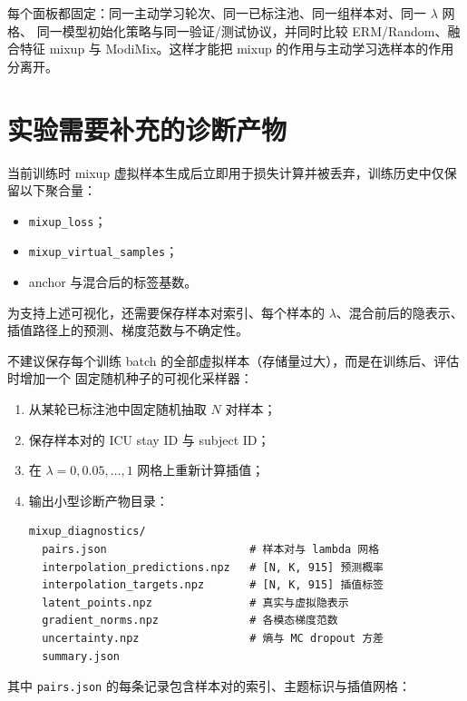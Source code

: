 \documentclass[11pt,a4paper]{article}
\theoremstyle{definition}
\begin{document}
每个面板都固定：同一主动学习轮次、同一已标注池、同一组样本对、同一 $\lambda$ 网格、
同一模型初始化策略与同一验证/测试协议，并同时比较 ERM/Random、融合特征 mixup 与
ModiMix。这样才能把 mixup 的作用与主动学习选样本的作用分离开。

\section{实验需要补充的诊断产物}
\label{sec:artifacts}

当前训练时 mixup 虚拟样本生成后立即用于损失计算并被丢弃，训练历史中仅保留以下聚合量：

\begin{itemize}[itemsep=1pt]
  \item \texttt{mixup\_loss}；
  \item \texttt{mixup\_virtual\_samples}；
  \item anchor 与混合后的标签基数。
\end{itemize}

为支持上述可视化，还需要保存样本对索引、每个样本的 $\lambda$、混合前后的隐表示、
插值路径上的预测、梯度范数与不确定性。

不建议保存每个训练 batch 的全部虚拟样本（存储量过大），而是在训练后、评估时增加一个
固定随机种子的可视化采样器：

\begin{enumerate}[itemsep=1pt]
  \item 从某轮已标注池中固定随机抽取 $N$ 对样本；
  \item 保存样本对的 ICU stay ID 与 subject ID；
  \item 在 $\lambda=0,0.05,\ldots,1$ 网格上重新计算插值；
  \item 输出小型诊断产物目录：
        \begin{verbatim}
mixup_diagnostics/
  pairs.json                      # 样本对与 lambda 网格
  interpolation_predictions.npz   # [N, K, 915] 预测概率
  interpolation_targets.npz       # [N, K, 915] 插值标签
  latent_points.npz               # 真实与虚拟隐表示
  gradient_norms.npz              # 各模态梯度范数
  uncertainty.npz                 # 熵与 MC dropout 方差
  summary.json
        \end{verbatim}
\end{enumerate}

其中 \texttt{pairs.json} 的每条记录包含样本对的索引、主题标识与插值网格：
\end{document}
